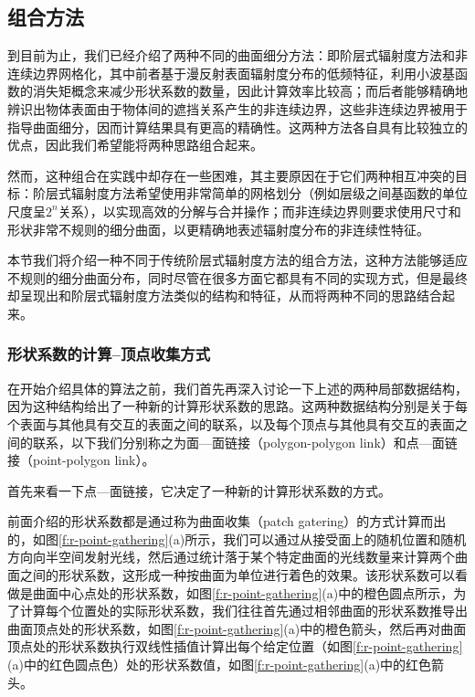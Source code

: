 \subsection{组合方法}\label{sec:r-combine}
到目前为止，我们已经介绍了两种不同的曲面细分方法：即阶层式辐射度方法和非连续边界网格化，其中前者基于漫反射表面辐射度分布的低频特征，利用小波基函数的消失矩概念来减少形状系数的数量，因此计算效率比较高；而后者能够精确地辨识出物体表面由于物体间的遮挡关系产生的非连续边界，这些非连续边界被用于指导曲面细分，因而计算结果具有更高的精确性。这两种方法各自具有比较独立的优点，因此我们希望能将两种思路组合起来。

然而，这种组合在实践中却存在一些困难，其主要原因在于它们两种相互冲突的目标：阶层式辐射度方法希望使用非常简单的网格划分（例如层级之间基函数的单位尺度呈$2^{n}$关系），以实现高效的分解与合并操作；而非连续边界则要求使用尺寸和形状非常不规则的细分曲面，以更精确地表述辐射度分布的非连续性特征。

本节我们将介绍一种不同于传统阶层式辐射度方法的组合方法，这种方法能够适应不规则的细分曲面分布，同时尽管在很多方面它都具有不同的实现方式，但是最终却呈现出和阶层式辐射度方法类似的结构和特征，从而将两种不同的思路结合起来。




\subsubsection{形状系数的计算--顶点收集方式}
在开始介绍具体的算法之前，我们首先再深入讨论一下上述的两种局部数据结构，因为这种结构给出了一种新的计算形状系数的思路。这两种数据结构分别是关于每个表面与其他具有交互的表面之间的联系，以及每个顶点与其他具有交互的表面之间的联系，以下我们分别称之为面—面链接（polygon-polygon link）和点—面链接（point-polygon link）。

首先来看一下点—面链接，它决定了一种新的计算形状系数的方式。

前面介绍的形状系数都是通过称为曲面收集（patch gatering）的方式计算而出的，如图\ref{f:r-point-gathering}(a)所示，我们可以通过从接受面上的随机位置和随机方向向半空间发射光线，然后通过统计落于某个特定曲面的光线数量来计算两个曲面之间的形状系数，这形成一种按曲面为单位进行着色的效果。该形状系数可以看做是曲面中心点处的形状系数，如图\ref{f:r-point-gathering}(a)中的橙色圆点所示，为了计算每个位置处的实际形状系数，我们往往首先通过相邻曲面的形状系数推导出曲面顶点处的形状系数，如图\ref{f:r-point-gathering}(a)中的橙色箭头，然后再对曲面顶点处的形状系数执行双线性插值计算出每个给定位置（如图\ref{f:r-point-gathering}(a)中的红色圆点色）处的形状系数值，如图\ref{f:r-point-gathering}(a)中的红色箭头。

